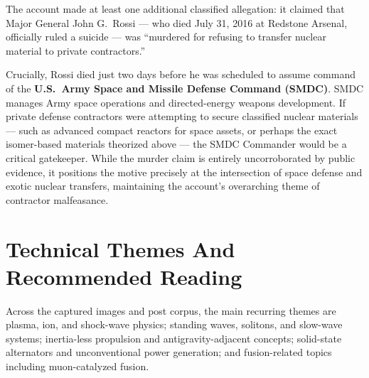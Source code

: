 \documentclass[11pt]{article}
\begin{document}
The account made at least one additional classified allegation: it claimed that Major General John G.\ Rossi — who died July 31, 2016 at Redstone Arsenal, officially ruled a suicide — was ``murdered for refusing to transfer nuclear material to private contractors.'' 

Crucially, Rossi died just two days before he was scheduled to assume command of the \textbf{U.S.\ Army Space and Missile Defense Command (SMDC)}. SMDC manages Army space operations and directed-energy weapons development. If private defense contractors were attempting to secure classified nuclear materials — such as advanced compact reactors for space assets, or perhaps the exact isomer-based materials theorized above — the SMDC Commander would be a critical gatekeeper. While the murder claim is entirely uncorroborated by public evidence, it positions the motive precisely at the intersection of space defense and exotic nuclear transfers, maintaining the account's overarching theme of contractor malfeasance.

\section{Technical Themes And Recommended Reading}

Across the captured images and post corpus, the main recurring themes are plasma, ion, and shock-wave physics; standing waves, solitons, and slow-wave systems; inertia-less propulsion and antigravity-adjacent concepts; solid-state alternators and unconventional power generation; and fusion-related topics including muon-catalyzed fusion.
\end{document}
